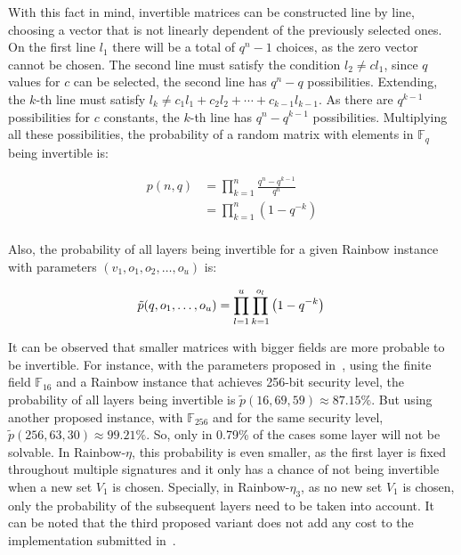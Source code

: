 \documentclass{ufsctex/ufsctex}
\begin{document}
With this fact in mind, invertible matrices can be constructed line by line,
choosing a vector that is not linearly dependent of the previously selected
ones. On the first line $l_1$ there will be a total of $q^n - 1$ choices, as
the zero vector cannot be chosen. The second line must satisfy the condition
$l_2 \neq c l_1$, since $q$ values for $c$ can be selected, the second line has
$q^n - q$ possibilities. Extending, the $k$-th line must satisfy $l_k \ne
c_1l_1 + c_2l_2 + \cdots + c_{k-1}l_{k-1}$. As there are $q^{k-1}$
possibilities for $c$ constants, the $k$-th line has $q^n - q^{k-1}$
possibilities. Multiplying all these possibilities, the probability of a random
matrix with elements in $\mathbb{F}_q$ being invertible is:

\begin{equation}
\begin{split}
p(n, q) &= \prod_{k=1}^{n} \frac{q^n - q^{k-1}}{q^n} \\
&= \prod_{k=1}^{n} \left( 1 - q^{-k} \right) \\
\end{split}
\end{equation}

Also, the probability of all layers being invertible for a given Rainbow
instance with parameters $(v_1, o_1, o_2, \ldots, o_u)$ is:

\begin{equation}
\tilde{p}(q, o_1, \ldots, o_u) =
	\prod_{l=1}^{u} \prod_{k=1}^{o_l} \left( 1 - q^{-k} \right) \\
\end{equation}

It can be observed that smaller matrices with bigger fields are more probable
to be invertible. For instance, with the parameters proposed in~\cite[Chapter
6]{petzoldt2013thesis}, using the finite field $\mathbb{F}_{16}$ and a Rainbow
instance that achieves 256-bit security level, the probability of all layers
being invertible is $\tilde{p}(16, 69, 59) \approx 87.15\%$. But using another
proposed instance, with $\mathbb{F}_{256}$ and for the same security level,
$\tilde{p}(256, 63, 30) \approx 99.21\%$. So, only in 0.79\% of the cases some
layer will not be solvable. In Rainbow-$\eta$, this probability is even
smaller, as the first layer is fixed throughout multiple signatures and it only
has a chance of not being invertible when a new set $V_1$ is chosen. Specially,
in Rainbow-$\eta_3$, as no new set $V_1$ is chosen, only the probability of the
subsequent layers need to be taken into account. It can be noted that the third
proposed variant does not add any cost to the implementation submitted
in~\cite{ding2017nist}.
\end{document}
